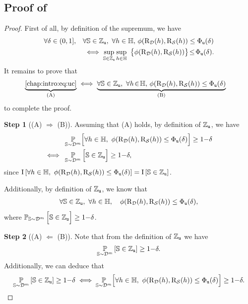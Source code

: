 \begin{noaddcontents}
\section{Proof of }
\label{ap:dis-mu:sec:proof-prop-uc}

\propositionuc*
\begin{proof}
First of all, by definition of the supremum, we have
\begin{align*}
    \forall\delta\in(0,1],\quad &\forall \S\in\setUC,\ \forall \h\in\H,\, \phi(\Risk_{\D}(\h), \Risk_{\dS}(\h)) \le \PhiUC(\delta)\\
    &\iff  \sup_{\S\in\setUC}\sup_{\h\in\H}\ \big\{\phi(\Risk_{\D}(\h), \Risk_{\dS}(\h))\big\}\! \le\! \PhiUC(\delta).
\end{align*}
It remains to prove that
\begin{align*}
\underbrace{\text{\Cref{chap:intro:eq:uc}}}_{\text{(A)}} &\iff \underbrace{\forall \S \in \setUC,\   \forall h\!\in\! \H,\, \phi(\Risk_{\D}(\h), \Risk_{\dS}(\h)) \le \PhiUC(\delta)}_{\text{(B)}}
\end{align*}
to complete the proof.

\textbf{Step 1} ((A) $\Rightarrow$ (B)).
Assuming that (A) holds, by definition of $\mathbb{Z}_{{\tt u}}$, we have
\begin{align*}
    &\operatorname*{\mathbb{P}}_{\mathbb{S}\sim\mathcal{D}^m}\!\Big[ \forall h\in\mathbb{H},\  \phi(\text{R}_{\mathcal{D}}(h), \text{R}_{\mathcal{S}}(h)) \le \Phi_{{\tt u}}(\delta) \Big] \ge 1{-}\delta\\
    \iff\ &\operatorname*{\mathbb{P}}_{\mathbb{S}\sim\mathcal{D}^m}\Big[ \mathbb{S} \in \mathbb{Z}_{{\tt u}} \Big] \ge 1{-}\delta,
\end{align*}
since $\operatorname{I}\left[ \forall h\in\mathbb{H},\  \phi(\text{R}_{\mathcal{D}}(h), \text{R}_{\mathcal{S}}(h)) \le \Phi_{{\tt u}}(\delta) \right] = \operatorname{I}\left[ \mathbb{S} \in \mathbb{Z}_{{\tt u}} \right]$.

Additionally, by definition of $\mathbb{Z}_{{\tt u}}$, we know that
\begin{align*}
    \forall \mathbb{S}\in \mathbb{Z}_{{\tt u}},\  \forall h\in\mathbb{H}, \quad \phi(\text{R}_{\mathcal{D}}(h), \text{R}_{\mathcal{S}}(h)) \le \Phi_{{\tt u}}(\delta),
\end{align*}
where $\operatorname*{\mathbb{P}}_{\mathbb{S}\sim\mathcal{D}^m}\Big[ \mathbb{S} \in \mathbb{Z}_{{\tt u}} \Big] \ge 1{-}\delta$.

\textbf{Step 2} ((A) $\Leftarrow$ (B)).
Note that from the definition of $\mathbb{Z}_{{\tt u}}$ we have 
\begin{align*}
\operatorname*{\mathbb{P}}_{\mathbb{S}\sim\mathcal{D}^m}\left[ \mathbb{S} \in\mathbb{Z}_{{\tt u}} \right] \ge  1{-}\delta.
\end{align*}
Additionally, we can deduce that
\begin{align*}
    \operatorname*{\mathbb{P}}_{\mathbb{S}\sim\mathcal{D}^m}\left[ \mathbb{S} \in\mathbb{Z}_{{\tt u}} \right] \ge  1{-}\delta \iff \operatorname*{\mathbb{P}}_{\mathbb{S}\sim\mathcal{D}^m}\!\Big[ \forall h\in\mathbb{H},\  \phi(\text{R}_{\mathcal{D}}(h), \text{R}_{\mathcal{S}}(h)) \le \Phi_{{\tt u}}(\delta) \Big] \ge 1{-}\delta.
\end{align*}
\end{proof}


\end{noaddcontents}
